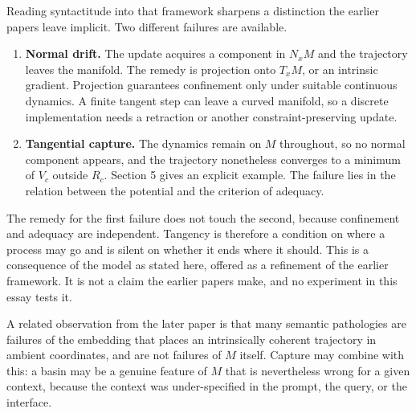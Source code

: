 \documentclass[11pt]{article}
\begin{document}
Reading syntactitude into that framework sharpens a distinction the earlier papers leave implicit. Two different failures are available.

\begin{enumerate}
\item \textbf{Normal drift.} The update acquires a component in $N_xM$ and the trajectory leaves the manifold. The remedy is projection onto $T_xM$, or an intrinsic gradient. Projection guarantees confinement only under suitable continuous dynamics. A finite tangent step can leave a curved manifold, so a discrete implementation needs a retraction or another constraint-preserving update.
\item \textbf{Tangential capture.} The dynamics remain on $M$ throughout, so no normal component appears, and the trajectory nonetheless converges to a minimum of $V_c$ outside $R_c$. Section 5 gives an explicit example. The failure lies in the relation between the potential and the criterion of adequacy.
\end{enumerate}

The remedy for the first failure does not touch the second, because confinement and adequacy are independent. Tangency is therefore a condition on where a process may go and is silent on whether it ends where it should. This is a consequence of the model as stated here, offered as a refinement of the earlier framework. It is not a claim the earlier papers make, and no experiment in this essay tests it.

A related observation from the later paper is that many semantic pathologies are failures of the embedding that places an intrinsically coherent trajectory in ambient coordinates, and are not failures of $M$ itself. Capture may combine with this: a basin may be a genuine feature of $M$ that is nevertheless wrong for a given context, because the context was under-specified in the prompt, the query, or the interface.
\end{document}
